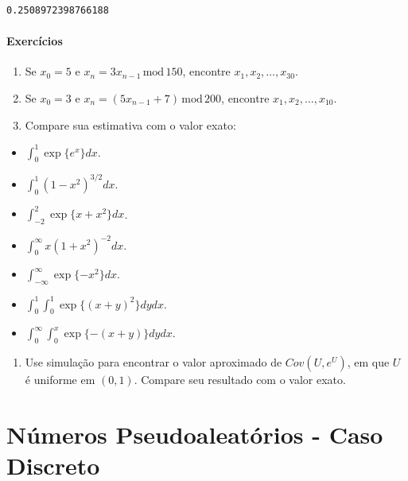 \documentclass[
  letterpaper,
  DIV=11,
  numbers=noendperiod]{scrreprt}
\providecommand{\tightlist}{%
  \setlength{\itemsep}{0pt}\setlength{\parskip}{0pt}}\usepackage{longtable,booktabs,array}
\begin{document}
\begin{verbatim}
0.2508972398766188
\end{verbatim}

\subsubsection*{Exercícios}\label{exercuxedcios-6}

\begin{enumerate}
\def\labelenumi{\arabic{enumi}.}
\item
  Se \(x_0 = 5\) e \(x_n = 3x_{n-1}\, \text{mod}\, 150\), encontre
  \(x_1, x_2, \dots, x_{30}\).
\item
  Se \(x_0 = 3\) e \(x_n = (5x_{n-1} + 7)\, \text{mod}\, 200\), encontre
  \(x_1, x_2, \dots, x_{10}\).
\item
  Compare sua estimativa com o valor exato:
\end{enumerate}

\begin{itemize}
\item
  \(\int_{0}^{1} \exp\{{e^x}\} dx\).
\item
  \(\int_{0}^{1} (1 - x^2)^{3/2} dx\).
\item
  \(\int_{-2}^{2} \exp\{x + x^2\} dx\).
\item
  \(\int_{0}^{\infty} x(1 + x^2)^{-2} dx\).
\item
  \(\int_{-\infty}^{\infty} \exp\{-x^2\} dx\).
\item
  \(\int_{0}^{1}\int_{0}^{1} \exp\{(x+y)^2\} dy dx\).
\item
  \(\int_{0}^{\infty}\int_{0}^{x} \exp\{-(x+y)\} dydx\).
\end{itemize}

\begin{enumerate}
\def\labelenumi{\arabic{enumi}.}
\setcounter{enumi}{3}
\tightlist
\item
  Use simulação para encontrar o valor aproximado de \(Cov(U, e^U)\), em
  que \(U\) é uniforme em \((0,1)\). Compare seu resultado com o valor
  exato.
\end{enumerate}


\chapter{Números Pseudoaleatórios - Caso
Discreto}\label{nuxfameros-pseudoaleatuxf3rios---caso-discreto}
\end{document}
